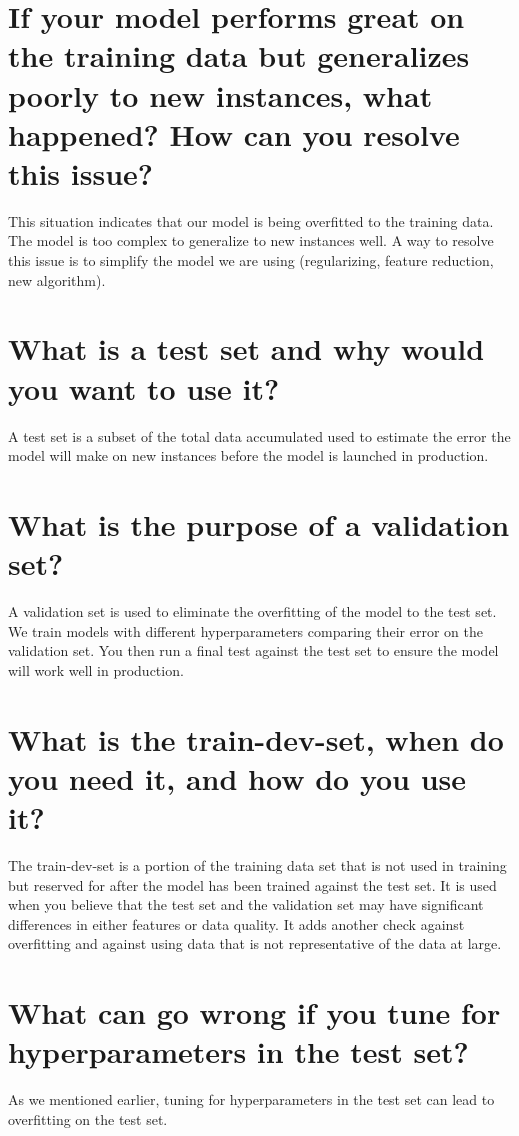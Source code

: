 \documentclass[letterpaper,12pt]{article}
\begin{document}
	\section{If your model performs great on the training data but generalizes poorly to new instances, what happened? How can you resolve this issue?}
	This situation indicates that our model is being overfitted to the training data. The model is too complex to generalize to new instances well. A way to resolve this issue is to simplify the model we are using (regularizing, feature reduction, new algorithm).
	
	\section{What is a test set and why would you want to use it?}
	A test set is a subset of the total data accumulated used to estimate the error the model will make on new instances before the model is launched in production.
	
	\section{What is the purpose of a validation set?}
	A validation set is used to eliminate the overfitting of the model to the test set. We train models with different hyperparameters comparing their error on the validation set. You then run a final test against the test set to ensure the model will work well in production.
	
	\section{What is the train-dev-set, when do you need it, and how do you use it?}
	The train-dev-set is a portion of the training data set that is not used in training but reserved for after the model has been trained against the test set. It is used when you believe that the test set and the validation set may have significant differences in either features or data quality. It adds another check against overfitting and against using data that is not representative of the data at large.
	
	\section{What can go wrong if you tune for hyperparameters in the test set?}
	As we mentioned earlier, tuning for hyperparameters in the test set can lead to overfitting on the test set.
\end{document}
